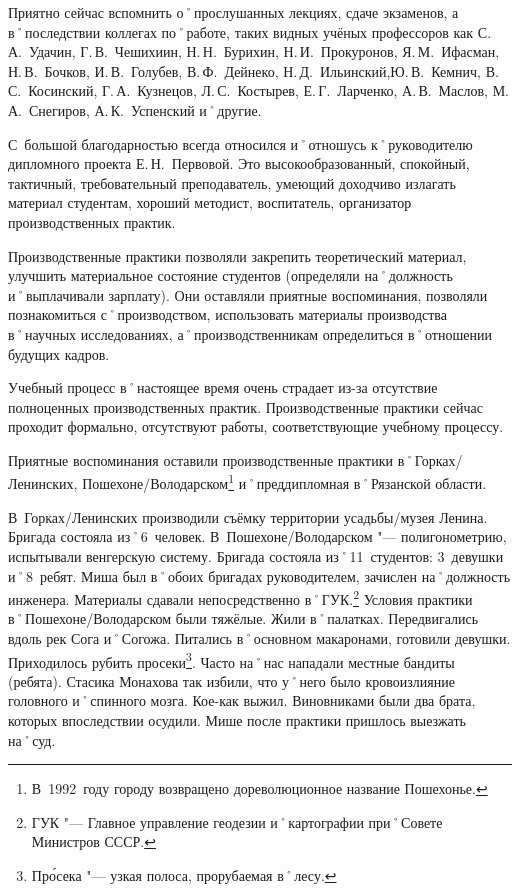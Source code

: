 Приятно сейчас вспомнить о˚прослушанных лекциях, сдаче экзаменов, а в˚последствии коллегах по˚работе, таких видных учёных профессоров как С.\,А.~Удачин, Г.\,В.~Чешихиин, Н.\,Н.~Бурихин, Н.\,И.~Прокуронов, Я.\,М.~Ифасман, Н.\,В.~Бочков, И.\,В.~Голубев, В.\,Ф.~Дейнеко, Н.\,Д.~Ильинский,Ю.\,В.~Кемнич, В.\,С.~Косинский, Г.\,А.~Кузнецов, Л.\,С.~Костырев, Е.\,Г.~Ларченко, А.\,В.~Маслов, М.\,А.~Снегиров, А.\,К.~Успенский и˚другие.

С~большой благодарностью всегда относился и˚отношусь к˚руководителю дипломного проекта Е.\,Н.~Первовой. Это высокообразованный, спокойный, тактичный, требовательный преподаватель, умеющий доходчиво излагать материал студентам, хороший методист, воспитатель, организатор производственных практик.

Производственные практики позволяли закрепить теоретический материал, улучшить материальное состояние студентов (определяли на˚должность и˚выплачивали зарплату). Они оставляли приятные воспоминания, позволяли познакомиться с˚производством, использовать материалы производства в˚научных исследованиях, а˚производственникам определиться в˚отношении будущих кадров.

Учебный процесс в˚настоящее время очень страдает из-за отсутствие полноценных производственных практик. Производственные практики сейчас проходит формально, отсутствуют работы, соответствующие учебному процессу. 

Приятные воспоминания оставили производственные практики в˚Горках\-/Ленинских, Пошехоне\-/Володарском\footnote{В~1992~году городу возвращено дореволюционное название Пошехонье.} и˚преддипломная в˚Рязанской области.

В~Горках\-/Ленинских производили съёмку территории усадьбы\-/музея Ленина. Бригада состояла из˚6~человек. В~Пошехоне\-/Володарском "--- полигонометрию, испытывали венгерскую систему. Бригада состояла из˚11~студентов: 3~девушки и˚8~ребят. Миша был в˚обоих бригадах руководителем, зачислен на˚должность инженера. Материалы сдавали непосредственно в˚ГУК.\footnote{ГУК "--- Главное управление геодезии и˚картографии при˚Совете Министров СССР.} Условия практики в˚Пошехоне\-/Володарском были тяжёлые. Жили в˚палатках. Передвигались вдоль рек Сога и˚Согожа. Питались в˚основном макаронами, готовили девушки. Приходилось рубить просеки\footnote{Пр\'{о}сека "--- узкая полоса, прорубаемая в˚лесу.}. Часто на˚нас нападали местные бандиты (ребята). Стасика Монахова так избили, что у˚него было кровоизлияние головного и˚спинного мозга. Кое-как выжил. Виновниками были два брата, которых впоследствии осудили. Мише после практики пришлось выезжать на˚суд. 

